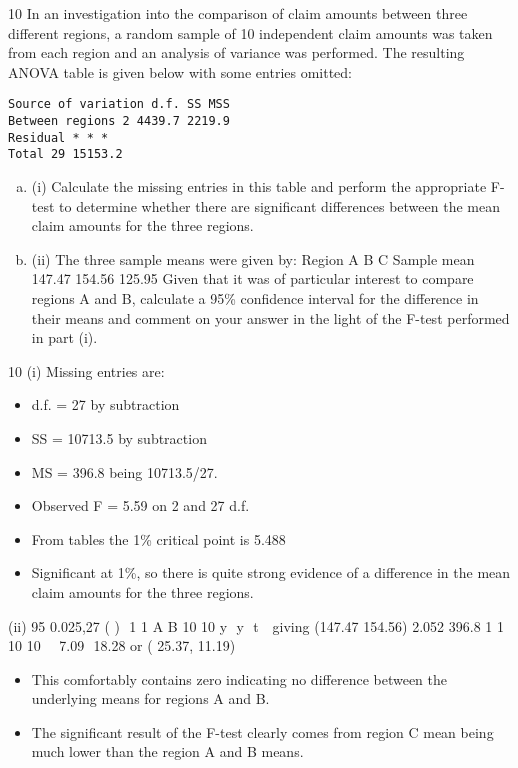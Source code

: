 \documentclass[a4paper,12pt]{article}
\begin{document}
10 In an investigation into the comparison of claim amounts between three different
regions, a random sample of 10 independent claim amounts was taken from each
region and an analysis of variance was performed. The resulting ANOVA table is
given below with some entries omitted:
\begin{verbatim}
Source of variation d.f. SS MSS
Between regions 2 4439.7 2219.9
Residual * * *
Total 29 15153.2    
\end{verbatim}

\begin{enumerate}[(a)]
    \item (i) Calculate the missing entries in this table and perform the appropriate F-test to
determine whether there are significant differences between the mean claim
amounts for the three regions. 
    \item (ii) The three sample means were given by:
Region A B C
Sample mean 147.47 154.56 125.95
Given that it was of particular interest to compare regions A and B, calculate a
95\% confidence interval for the difference in their means and comment on
your answer in the light of the F-test performed in part (i). 
\end{enumerate}
\newpage

10 (i) Missing entries are:
\begin{itemize}
    \item d.f. = 27 by subtraction
    \item SS = 10713.5 by subtraction
    \item MS = 396.8 being 10713.5/27.
    \item Observed F = 5.59 on 2 and 27 d.f.
    \item From tables the 1\% critical point is 5.488
    \item Significant at 1\%, so there is quite strong evidence of a difference in the mean
claim amounts for the three regions.
\end{itemize}

(ii) 95%
0.025,27
( )  1 1
A B 10 10 y  y  t  
giving
(147.47 154.56) 2.052 396.8 1 1
10 10
  
	7.09  18.28 or (	25.37, 11.19)
	\begin{itemize}
    \item
This comfortably contains zero indicating no difference between the
underlying means for regions A and B.
\item The significant result of the F-test clearly comes from region C mean being
much lower than the region A and B means.
\end{itemize}
\end{document}

